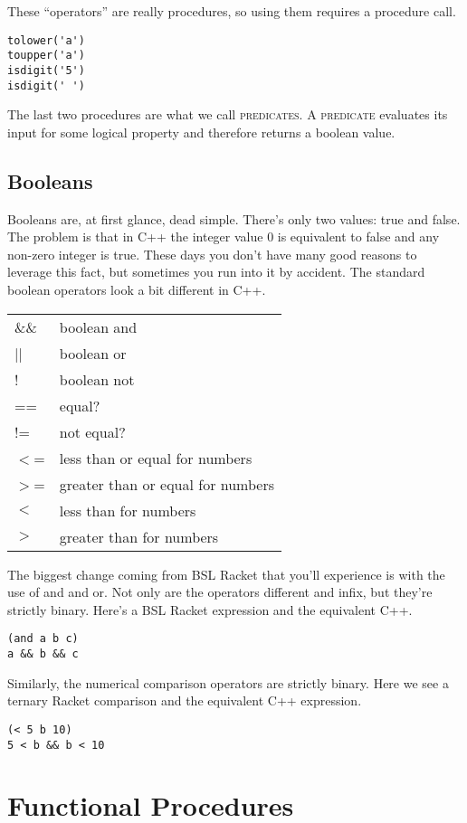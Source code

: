 \documentclass[]{tufte-handout}
\begin{document}
These ``operators'' are really procedures, so using them requires a procedure call.
\begin{verbatim}
tolower('a')
toupper('a')
isdigit('5')
isdigit(' ')
\end{verbatim}
The last two procedures are what we call \textsc{predicates}. A \textsc{predicate} evaluates its input for some logical property and therefore returns a boolean value.

\subsection{Booleans}

Booleans are, at first glance, dead simple. There's only two values: true and false.  The problem is that in C++ the integer value 0 is equivalent to false and any non-zero integer is true.  These days you don't have many good reasons to leverage this fact, but sometimes you run into it by accident. The standard boolean operators look a bit different in C++.

\begin{center}
\begin{tabular}{ll}
\&\& & boolean and \\
|| & boolean or \\
! & boolean not \\
== & equal? \\
!= & not equal? \\
$<$= & less than or equal for numbers \\
$>$= & greater than or equal for numbers \\
$<$ & less than for numbers \\
$>$ & greater than for numbers
\end{tabular}
\end{center}

The biggest change coming from BSL Racket that you'll experience is with the use of and and or.  Not only are the operators different and infix, but they're strictly binary.  Here's a BSL Racket expression and the equivalent C++.
\begin{verbatim}
(and a b c) 
a && b && c 
\end{verbatim}
Similarly, the numerical comparison operators are strictly binary. Here we see a ternary Racket comparison and the equivalent C++ expression.
\begin{verbatim}
(< 5 b 10)
5 < b && b < 10
\end{verbatim}


\section{Functional Procedures}
\end{document}
